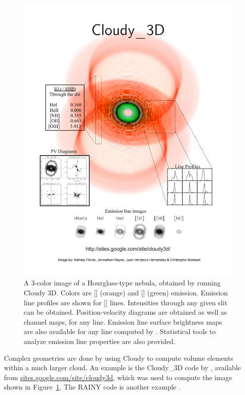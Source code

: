 \begin{figure}
\centering
\includegraphics[width=\columnwidth]{posterhazy02}
\caption[Cloudy\_3D simulation of a planetary nebula]
{A 3-color image of a Hourglass-type nebula, 
obtained by running Cloudy 3D.
Colors are [\nii ] (orange) and [\oiii ] (green) emission. 
Emission line profiles are shown for [\nii ] lines. 
Intensities through any given slit can be obtained. 
Position-velocity diagrams are obtained as well as
channel maps, for any line. 
Emission line surface brightness maps are
also available for any line computed by \Cloudy. 
Statistical tools to
analyze emission line properties are also provided.}
\label{fig:Cloudy3D}
\end{figure}

Complex geometries are done by using Cloudy to compute volume elements
within a much larger cloud.
An example is the Cloudy\_3D code by 
\citet{MorissetStasinskaCloudy3D08}, 
available from 
\href{http://sites.google.com/site/cloudy3d/}{sites.google.com/site/cloudy3d},
which was used to compute
the image shown in Figure~\ref{fig:Cloudy3D}.
The RAINY code is another example 
\citep{MoraesDiazRAINY09}.

